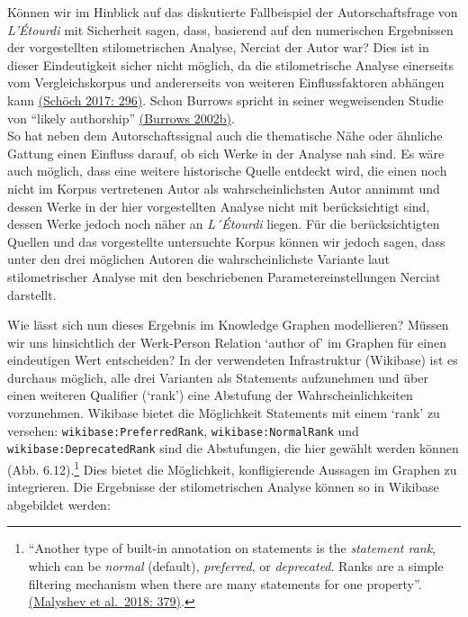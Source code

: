 \documentclass[
  letterpaper,
  DIV=11,
  numbers=noendperiod]{scrreprt}
\begin{document}
Können wir im Hinblick auf das diskutierte Fallbeispiel der
Autorschaftsfrage von \emph{L'Étourdi} mit Sicherheit sagen, dass,
basierend auf den numerischen Ergebnissen der vorgestellten
stilometrischen Analyse, Nerciat der Autor war? Dies ist in dieser
Eindeutigkeit sicher nicht möglich, da die stilometrische Analyse
einerseits vom Vergleichskorpus und andererseits von weiteren
Einflussfaktoren abhängen kann
\href{https://www.zotero.org/google-docs/?M86EBF}{(Schöch 2017: 296)}.
Schon Burrows spricht in seiner wegweisenden Studie von ``likely
authorship'' \href{https://www.zotero.org/google-docs/?RezQQS}{(Burrows
2002b)}.\\
So hat neben dem Autorschaftssignal auch die thematische Nähe oder
ähnliche Gattung einen Einfluss darauf, ob sich Werke in der Analyse nah
sind. Es wäre auch möglich, dass eine weitere historische Quelle
entdeckt wird, die einen noch nicht im Korpus vertretenen Autor als
wahrscheinlichsten Autor annimmt und dessen Werke in der hier
vorgestellten Analyse nicht mit berücksichtigt sind, dessen Werke jedoch
noch näher an \emph{L´Étourdi} liegen. Für die berücksichtigten Quellen
und das vorgestellte untersuchte Korpus können wir jedoch sagen, dass
unter den drei möglichen Autoren die wahrscheinlichste Variante laut
stilometrischer Analyse mit den beschriebenen Parametereinstellungen
Nerciat darstellt.

Wie lässt sich nun dieses Ergebnis im Knowledge Graphen modellieren?
Müssen wir uns hinsichtlich der Werk-Person Relation `author of' im
Graphen für einen eindeutigen Wert entscheiden? In der verwendeten
Infrastruktur (Wikibase) ist es durchaus möglich, alle drei Varianten
als Statements aufzunehmen und über einen weiteren Qualifier (`rank')
eine Abstufung der Wahrscheinlichkeiten vorzunehmen. Wikibase bietet die
Möglichkeit Statements mit einem `rank' zu versehen:
\texttt{wikibase:PreferredRank}, \texttt{wikibase:NormalRank} und
\texttt{wikibase:DeprecatedRank} sind die Abstufungen, die hier gewählt
werden können (Abb. 6.12).\footnote{``Another type of built-in
  annotation on statements is the \emph{statement rank}, which can be
  \emph{normal} (default), \emph{preferred}, or \emph{deprecated}. Ranks
  are a simple filtering mechanism when there are many statements for
  one property''.
  \href{https://www.zotero.org/google-docs/?n9uCLt}{(Malyshev et
  al.~2018: 379)}.} Dies bietet die Möglichkeit, konfligierende Aussagen
im Graphen zu integrieren. Die Ergebnisse der stilometrischen Analyse
können so in Wikibase abgebildet werden:
\end{document}
